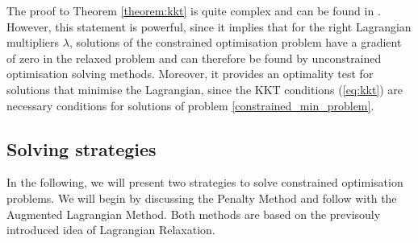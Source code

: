 The proof to Theorem \ref{theorem:kkt} is quite complex and can be found in \cite{NoceWrig06}. However, this statement is powerful, since it implies that for the right Lagrangian multipliers $\lambda$, solutions of the constrained optimisation problem have a gradient of zero in the relaxed problem and can therefore be found by unconstrained optimisation solving methods. Moreover, it provides an optimality test for solutions that minimise the Lagrangian, since the KKT conditions (\ref{eq:kkt}) are necessary conditions for solutions of problem \ref{constrained_min_problem}.\\




\subsection{Solving strategies}
In the following, we will present two strategies to solve constrained optimisation problems. We will begin by discussing the Penalty Method and follow with the Augmented Lagrangian Method. Both methods are based on the previsouly introduced idea of Lagrangian Relaxation.
